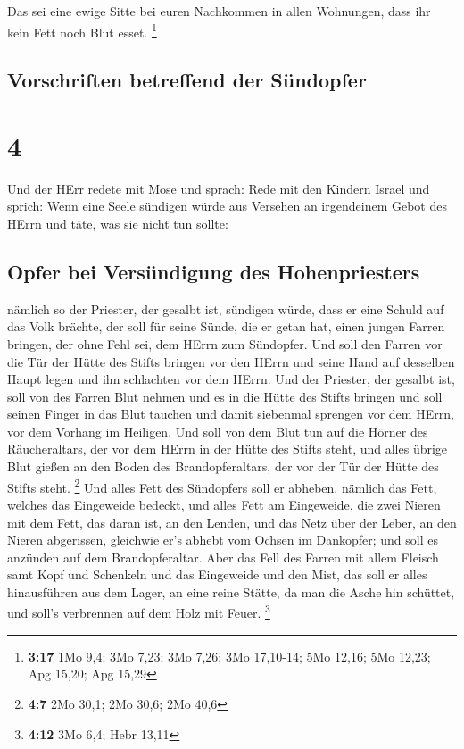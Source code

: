  Das sei eine ewige Sitte bei euren Nachkommen in allen
Wohnungen, dass ihr kein Fett noch Blut esset. \footnote{\textbf{3:17}
  1Mo 9,4; 3Mo 7,23; 3Mo 7,26; 3Mo 17,10-14; 5Mo 12,16; 5Mo 12,23; Apg
  15,20; Apg 15,29}

\hypertarget{vorschriften-betreffend-der-suxfcndopfer}{%
\subsection{Vorschriften betreffend der
Sündopfer}\label{vorschriften-betreffend-der-suxfcndopfer}}

\hypertarget{section-3}{%
\section{4}\label{section-3}}

 Und der HErr redete mit Mose und sprach: 
Rede mit den Kindern Israel und sprich: Wenn eine Seele sündigen würde
aus Versehen an irgendeinem Gebot des HErrn und täte, was sie nicht tun
sollte:

\hypertarget{opfer-bei-versuxfcndigung-des-hohenpriesters}{%
\subsection{Opfer bei Versündigung des
Hohenpriesters}\label{opfer-bei-versuxfcndigung-des-hohenpriesters}}

 nämlich so der Priester, der gesalbt ist, sündigen würde,
dass er eine Schuld auf das Volk brächte, der soll für seine Sünde, die
er getan hat, einen jungen Farren bringen, der ohne Fehl sei, dem HErrn
zum Sündopfer.  Und soll den Farren vor die Tür der Hütte
des Stifts bringen vor den HErrn und seine Hand auf desselben Haupt
legen und ihn schlachten vor dem HErrn.  Und der Priester,
der gesalbt ist, soll von des Farren Blut nehmen und es in die Hütte des
Stifts bringen  und soll seinen Finger in das Blut tauchen
und damit siebenmal sprengen vor dem HErrn, vor dem Vorhang im Heiligen.
 Und soll von dem Blut tun auf die Hörner des
Räucheraltars, der vor dem HErrn in der Hütte des Stifts steht, und
alles übrige Blut gießen an den Boden des Brandopferaltars, der vor der
Tür der Hütte des Stifts steht. \footnote{\textbf{4:7} 2Mo 30,1; 2Mo
  30,6; 2Mo 40,6}  Und alles Fett des Sündopfers soll er
abheben, nämlich das Fett, welches das Eingeweide bedeckt, und alles
Fett am Eingeweide,  die zwei Nieren mit dem Fett, das
daran ist, an den Lenden, und das Netz über der Leber, an den Nieren
abgerissen,  gleichwie er's abhebt vom Ochsen im
Dankopfer; und soll es anzünden auf dem Brandopferaltar. 
Aber das Fell des Farren mit allem Fleisch samt Kopf und Schenkeln und
das Eingeweide und den Mist,  das soll er alles
hinausführen aus dem Lager, an eine reine Stätte, da man die Asche hin
schüttet, und soll's verbrennen auf dem Holz mit Feuer. \footnote{\textbf{4:12}
  3Mo 6,4; Hebr 13,11}

